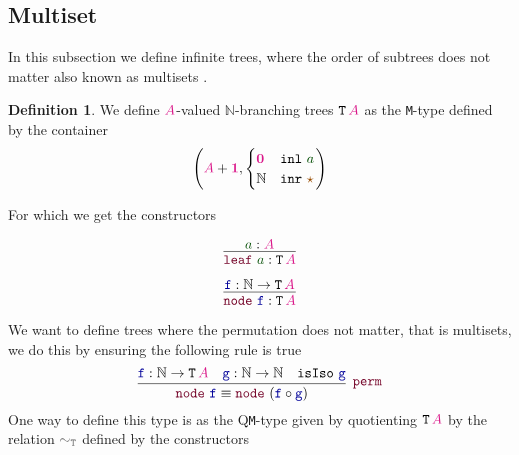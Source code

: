 \documentclass[twoside,11pt,openright]{report}
\theoremstyle{plain} %
\theoremstyle{definition}
\newtheorem{defn}[thm]{Definition}%
\theoremstyle{remark}
\newcommand*{\term}[1]{\textcolor{green!30!black}{#1}} %
\newcommand*{\type}[1]{\textcolor{magenta!90!black}{#1}}
\newcommand*{\unit}{\type{\textbf{1}}}
\newcommand*{\empt}{\type{\textbf{0}}}
\newcommand*{\relation}[1]{\textcolor{gray!75!black}{\ensuremath{\mathtt{#1}}}}
\newcommand*{\constant}[1]{\textcolor{orange!60!black}{\ensuremath{\mathtt{#1}}}}
\newcommand*{\function}[1]{\textcolor{blue!60!black}{\ensuremath{\mathtt{#1}}}}
\newcommand*{\constructor}[1]{\textcolor{purple!60!black}{\ensuremath{\mathtt{#1}}}}
\newcommand*{\typeformer}[1]{\ensuremath{\mathtt{#1}}}
\newcommand*{\unitelem}{\constant{\star}} %
\begin{document}
\subsection{Multiset}
In this subsection we define infinite trees, where the order of subtrees does not matter also known as multisets \cite{DBLP:QIIT}\cite{DBLP:tt-in-tt}\cite{DBLP:Constructing-QIITs}.
\begin{defn}
  We define \(\type{A}\)-valued \(\mathbb{N}\)-branching trees \(\typeformer{T}\,\type{A}\) as the \texttt{M}-type defined by the container
  \begin{equation}
    \left(\type{A}+\unit, \begin{cases} \empt & \mathtt{inl}~\term{a} \\ \mathbb{N} & \mathtt{inr}~\unitelem \end{cases}\right)
  \end{equation}
\end{defn}
\noindent For which we get the constructors\\[-10mm]
\begin{center}
  \strut
  \hfill
  \begin{minipage}{0.25\linewidth}
    \begin{equation}
      \vcenter{\infer{\constructor{leaf}~\term{a} : \typeformer{T}\,\type{A}}{\term{a} : \type{A}}}
    \end{equation}
  \end{minipage}
  \hfill
  \begin{minipage}{0.25\linewidth}
    \begin{equation}
      \vcenter{\infer{\constructor{node}~\function{f} : \typeformer{T}\,\type{A}}{\function{f} : \mathbb{N} \rightarrow \typeformer{T}\,\type{A}}}
    \end{equation}
  \end{minipage}
  \hfill
  \strut
\end{center}
We want to define trees where the permutation does not matter, that is multisets, we do this by ensuring the following rule is true
\begin{equation}
  \vcenter{\infer[\constructor{perm}]{\constructor{node}~\function{f} \equiv \constructor{node}~(\function{f} \circ \function{g})}{\function{f} : \mathbb{N} \rightarrow \typeformer{T}\,\type{A} & \function{g} : \mathbb{N} \rightarrow \mathbb{N} & \mathtt{isIso}~\function{g}}}
\end{equation}
One way to define this type is as the Q\texttt{M}-type given by quotienting \(\typeformer{T}\,\type{A}\) by the relation \(\relation{\sim_T}\) defined by the constructors
\end{document}
